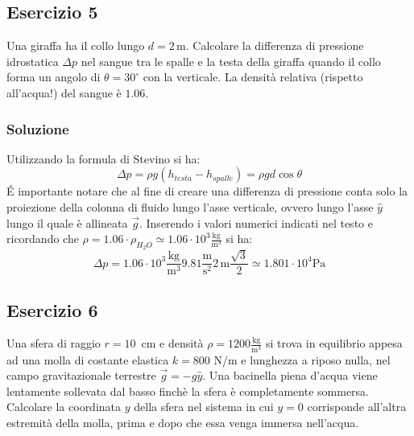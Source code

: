 \documentclass[12pt,a4paper]{book}
\begin{document}
\subsection*{Esercizio 5}
Una giraffa ha il collo lungo $d=2\,$m. Calcolare la differenza di pressione idrostatica $\Delta p$ nel sangue tra le spalle e la testa della giraffa quando il collo forma un angolo di $\theta=30^{\circ}$ con la verticale. La densità
relativa (rispetto all’acqua!) del sangue è $1.06$.

\subsubsection*{Soluzione}
Utilizzando la formula di Stevino si ha:
\begin{equation*}
\Delta p= \rho g (h_{testa} - h_{spalle})=  \rho g d \cos \theta
\end{equation*}
\'E importante notare che al fine di creare una differenza di pressione 
conta solo la proiezione della colonna di fluido lungo l'asse verticale, ovvero lungo l'asse $\hat{y}$ lungo il quale è allineata $\vec{g}$. 
Inserendo i valori numerici indicati nel testo e ricordando che $\rho=1.06 \cdot \rho_{H_2 O} \simeq 1.06 \cdot 10^{3}\frac{\text{kg}}{\text{m}^3}$ si ha: 
\begin{equation*}
\Delta p= 1.06 \cdot 10^{3} \frac{\text{kg}}{\text{m}^3} 9.81 \frac{\text{m}}{\text{s}^2} 2 \, \text{m} \frac{\sqrt{3}}{2} \simeq 1.801 \cdot 10^{4} \text{Pa}
\end{equation*}


\subsection*{Esercizio 6}
Una sfera di raggio $r=10\,$ cm e densità $\rho=1200 \frac{\text{kg}}{\text{m}^3}$ si trova in equilibrio appesa ad una molla di costante elastica $k = 800$ N/m e lunghezza a riposo nulla, nel campo gravitazionale terrestre $\vec{g}=-g\hat{y}$. Una bacinella piena d’acqua viene lentamente sollevata dal basso finchè la sfera è completamente sommersa. Calcolare la coordinata $y$ della sfera nel sistema in cui $y=0$ corrisponde all'altra estremità della molla, prima e dopo che essa venga immersa nell'acqua.
\end{document}
